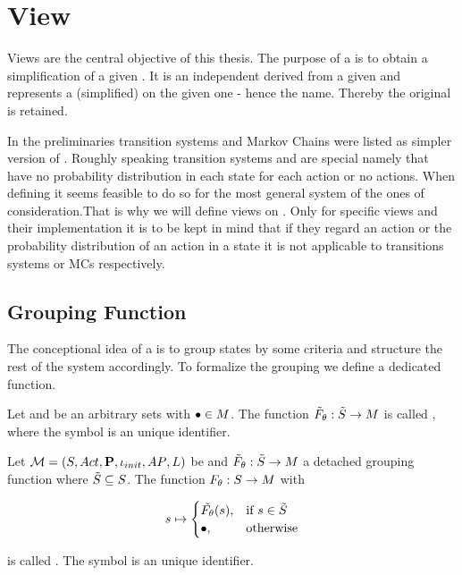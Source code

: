 \documentclass[preview]{standalone}
\begin{document}
	
\section{View}  \label{ch:view}
Views are the central objective of this thesis. The purpose of a \viewN is to obtain a simplification of a given \chgphN.  It is an independent \chgphN derived from a given \chgphN and represents a (simplified) \viewN on the given one - hence the name. Thereby the original \chgphN is retained.

In the preliminaries transition systems and Markov Chains were listed as simpler version of \mdpsN. Roughly speaking transition systems and \mdpsN are special \mdpsN namely that have no probability distribution in each state for each action or no actions. When defining \viewsN it seems feasible to do so for the most general system of the ones of consideration.That is why we will define views on \mdpsN. Only for specific views and their implementation it is to be kept in mind that if they regard an action or the probability distribution of an action in a state it is not applicable to transitions systems or MCs respectively. 

\subsection{Grouping Function}
The conceptional idea of a \viewN is to group states by some criteria and structure the rest of the system accordingly. To formalize the grouping we define a dedicated function.

\begin{definition}
	Let \smstates and \arbset be an arbitrary sets with ${\bullet} \in {M}$. The function ${\tilde{F}_{{\theta}}} : {\tilde{{S}}} \to {\ensuremath{{M}}}$ is called \emph{\grpfctsubN}, where the symbol \viewppty is an unique identifier.
	
	\label{def:grpfctsub}
\end{definition}


\begin{definition}
	Let ${{{\mathcal{M}}}} = {{({S}, {Act}, {\textbf{P}}, {\iota_{init}}, {AP}, {L})}}$ be \achgphN and ${\tilde{F}_{{\theta}}} : {\tilde{{S}}} \to {\ensuremath{{M}}}$ a detached grouping function where ${\tilde{{S}}} \subseteq {S}$. The function ${F_{{\theta}}} : {S} \to {\ensuremath{{M}}}$ with	
	
	\[
	\state \mapsto
	\begin{cases}
		\tilde\grpfct(s),				& \text{if } \state \in \smstates \\ 		\remelem,          	& \text{otherwise}
	\end{cases}
	\]
	
	is called \emph{\grpfctN}. The symbol \viewppty is an unique identifier.
	
	\label{def:grpfct}
\end{definition}
\end{document}
